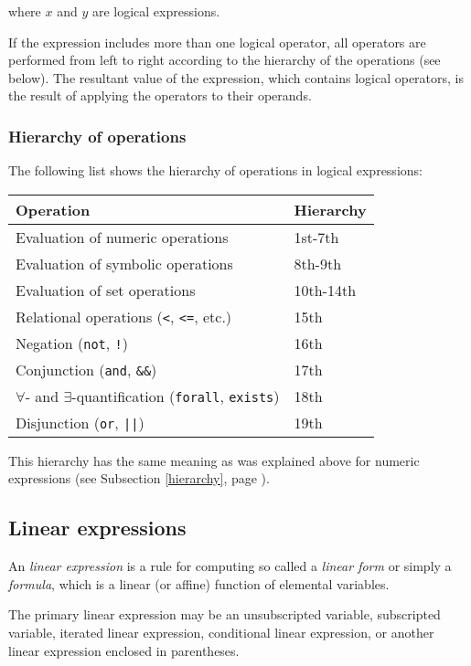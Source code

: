 \documentclass[10pt]{article}
\begin{document}
\medskip

\noindent where $x$ and $y$ are logical expressions.

If the expression includes more than one logical operator, all
operators are performed from left to right according to the hierarchy
of the operations (see below). The resultant value of the expression,
which contains logical operators, is the result of applying the
operators to their operands.

\subsubsection{Hierarchy of operations}

The following list shows the hierarchy of operations in logical
expressions:

\medskip

\noindent\hfil
\begin{tabular}{@{}ll@{}}
Operation&Hierarchy\\
\hline
Evaluation of numeric operations&1st-7th\\
Evaluation of symbolic operations&8th-9th\\
Evaluation of set operations&10th-14th\\
Relational operations ({\tt<}, {\tt<=}, etc.)&15th\\
Negation ({\tt not}, {\tt!})&16th\\
Conjunction ({\tt and}, {\tt\&\&})&17th\\
$\forall$- and $\exists$-quantification ({\tt forall}, {\tt exists})&
18th\\
Disjunction ({\tt or}, {\tt||})&19th\\
\end{tabular}

\medskip

This hierarchy has the same meaning as was explained above for numeric
expressions (see Subsection \ref{hierarchy}, page \pageref{hierarchy}).

\subsection{Linear expressions}

An {\it linear expression} is a rule for computing so called
a {\it linear form} or simply a {\it formula}, which is a linear (or
affine) function of elemental variables.

The primary linear expression may be an unsubscripted variable,
subscripted variable, iterated linear expression, conditional linear
expression, or another linear expression enclosed in parentheses.
\end{document}
